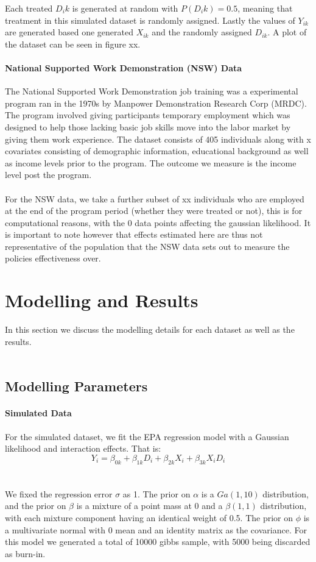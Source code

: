 \documentclass{article}
\begin{document}
Each treated $D_ik$ is generated at random with $P(D_ik) = 0.5$, meaning that treatment in this simulated dataset is randomly assigned. Lastly the values of $Y_{ik}$ are generated based one generated $X_{ik}$ and the randomly assigned $D_{ik}$. A plot of the dataset can be seen in figure xx. 

\paragraph{National Supported Work Demonstration (NSW) Data} The National Supported Work Demonstration job training was a experimental program ran in the 1970s by Manpower Demonstration Research Corp (MRDC). The program involved giving participants temporary employment which was designed to help those lacking basic job skills move into the labor market by giving them work experience. The dataset consists of 405 individuals along with x covariates consisting of demographic information, educational background as well as income levels prior to the program. The outcome we measure is the income level post the program. 
\\ \\ 
For the NSW data, we take a further subset of xx individuals who are employed at the end of the program period (whether they were treated or not), this is for computational reasons, with the 0 data points affecting the gaussian likelihood. It is important to note however that effects estimated here are thus not representative of the population that the NSW data sets out to measure the policies effectiveness over.


\section{Modelling and Results}
In this section we discuss the modelling details for each dataset as well as the results. 
\\ \\
\subsection{Modelling Parameters}
\paragraph{Simulated Data}
For the simulated dataset, we fit the EPA regression model with a Gaussian likelihood and interaction effects. That is:
$$Y_i = \beta_{0k} + \beta_{1k}D_i + \beta_{2k}X_i + \beta_{3k}X_iD_i$$
\\ \\
We fixed the regression error $\sigma$ as 1. The prior on $\alpha$ is a $Ga(1,10)$ distribution, and the prior on $\beta$ is a mixture of a point mass at 0 and a $\beta(1,1)$ distribution, with each mixture component having an identical weight of 0.5. The prior on $\phi$ is a multivariate normal with 0 mean and an identity matrix as the covariance.  For this model we generated a total of 10000 gibbs sample, with 5000 being discarded as burn-in. 
\end{document}
